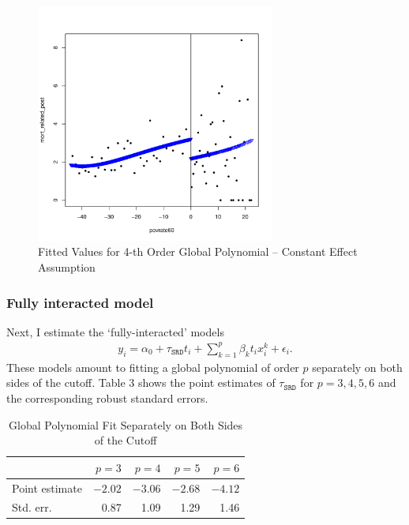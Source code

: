 \documentclass[12pt]{article}
\newcommand{\e}{\epsilon}
\begin{document}
\begin{figure}[htpb!]
    \centering
    \caption{Fitted Values for 4-th Order Global Polynomial -- Constant Effect Assumption}
        \includegraphics[width=0.7\textwidth]{q2-2-const.pdf}
\end{figure}

\subsubsection{Fully interacted model}
Next, I estimate the `fully-interacted' models
\begin{align*}
y_i = \alpha_0 +\tau_{\texttt{SRD}} t_i + \sum_{k=1}^p \beta_k t_i x_i^k + \e_i.
\end{align*}
These models amount to fitting a global polynomial of order $p$ separately on both sides of the cutoff. Table 3 shows the point estimates of $\tau_{\texttt{SRD}}$ for $p=3,4,5,6$ and the corresponding robust standard errors.

\begin{table}[htpb!]
\centering
\caption{Global Polynomial Fit Separately on Both Sides of the Cutoff}
\begin{tabular}{lrrrr}
  \hline
 & $p=3$ & $p=4$ & $p=5$ & $p=6$ \\  
  \hline
Point estimate & $-2.02$ & $-3.06$ & $-2.68$ & $-4.12$ \\ 
Std. err. & 0.87 & 1.09 & 1.29 & 1.46 \\ 
   \hline
\end{tabular}
\end{table}
\end{document}
